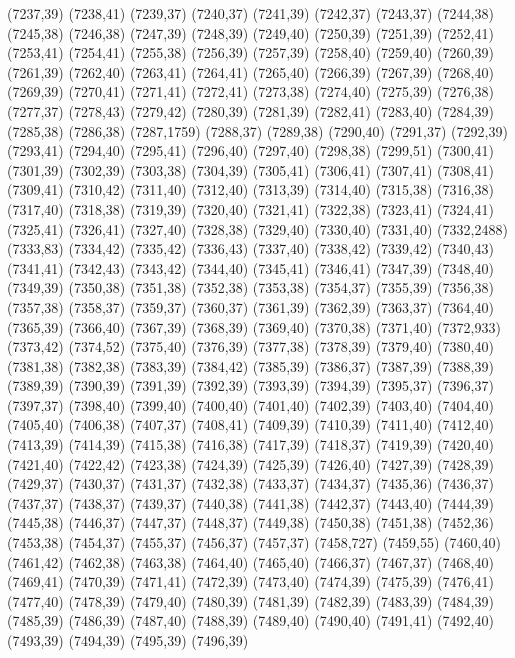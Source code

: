 (7237,39)
(7238,41)
(7239,37)
(7240,37)
(7241,39)
(7242,37)
(7243,37)
(7244,38)
(7245,38)
(7246,38)
(7247,39)
(7248,39)
(7249,40)
(7250,39)
(7251,39)
(7252,41)
(7253,41)
(7254,41)
(7255,38)
(7256,39)
(7257,39)
(7258,40)
(7259,40)
(7260,39)
(7261,39)
(7262,40)
(7263,41)
(7264,41)
(7265,40)
(7266,39)
(7267,39)
(7268,40)
(7269,39)
(7270,41)
(7271,41)
(7272,41)
(7273,38)
(7274,40)
(7275,39)
(7276,38)
(7277,37)
(7278,43)
(7279,42)
(7280,39)
(7281,39)
(7282,41)
(7283,40)
(7284,39)
(7285,38)
(7286,38)
(7287,1759)
(7288,37)
(7289,38)
(7290,40)
(7291,37)
(7292,39)
(7293,41)
(7294,40)
(7295,41)
(7296,40)
(7297,40)
(7298,38)
(7299,51)
(7300,41)
(7301,39)
(7302,39)
(7303,38)
(7304,39)
(7305,41)
(7306,41)
(7307,41)
(7308,41)
(7309,41)
(7310,42)
(7311,40)
(7312,40)
(7313,39)
(7314,40)
(7315,38)
(7316,38)
(7317,40)
(7318,38)
(7319,39)
(7320,40)
(7321,41)
(7322,38)
(7323,41)
(7324,41)
(7325,41)
(7326,41)
(7327,40)
(7328,38)
(7329,40)
(7330,40)
(7331,40)
(7332,2488)
(7333,83)
(7334,42)
(7335,42)
(7336,43)
(7337,40)
(7338,42)
(7339,42)
(7340,43)
(7341,41)
(7342,43)
(7343,42)
(7344,40)
(7345,41)
(7346,41)
(7347,39)
(7348,40)
(7349,39)
(7350,38)
(7351,38)
(7352,38)
(7353,38)
(7354,37)
(7355,39)
(7356,38)
(7357,38)
(7358,37)
(7359,37)
(7360,37)
(7361,39)
(7362,39)
(7363,37)
(7364,40)
(7365,39)
(7366,40)
(7367,39)
(7368,39)
(7369,40)
(7370,38)
(7371,40)
(7372,933)
(7373,42)
(7374,52)
(7375,40)
(7376,39)
(7377,38)
(7378,39)
(7379,40)
(7380,40)
(7381,38)
(7382,38)
(7383,39)
(7384,42)
(7385,39)
(7386,37)
(7387,39)
(7388,39)
(7389,39)
(7390,39)
(7391,39)
(7392,39)
(7393,39)
(7394,39)
(7395,37)
(7396,37)
(7397,37)
(7398,40)
(7399,40)
(7400,40)
(7401,40)
(7402,39)
(7403,40)
(7404,40)
(7405,40)
(7406,38)
(7407,37)
(7408,41)
(7409,39)
(7410,39)
(7411,40)
(7412,40)
(7413,39)
(7414,39)
(7415,38)
(7416,38)
(7417,39)
(7418,37)
(7419,39)
(7420,40)
(7421,40)
(7422,42)
(7423,38)
(7424,39)
(7425,39)
(7426,40)
(7427,39)
(7428,39)
(7429,37)
(7430,37)
(7431,37)
(7432,38)
(7433,37)
(7434,37)
(7435,36)
(7436,37)
(7437,37)
(7438,37)
(7439,37)
(7440,38)
(7441,38)
(7442,37)
(7443,40)
(7444,39)
(7445,38)
(7446,37)
(7447,37)
(7448,37)
(7449,38)
(7450,38)
(7451,38)
(7452,36)
(7453,38)
(7454,37)
(7455,37)
(7456,37)
(7457,37)
(7458,727)
(7459,55)
(7460,40)
(7461,42)
(7462,38)
(7463,38)
(7464,40)
(7465,40)
(7466,37)
(7467,37)
(7468,40)
(7469,41)
(7470,39)
(7471,41)
(7472,39)
(7473,40)
(7474,39)
(7475,39)
(7476,41)
(7477,40)
(7478,39)
(7479,40)
(7480,39)
(7481,39)
(7482,39)
(7483,39)
(7484,39)
(7485,39)
(7486,39)
(7487,40)
(7488,39)
(7489,40)
(7490,40)
(7491,41)
(7492,40)
(7493,39)
(7494,39)
(7495,39)
(7496,39)
